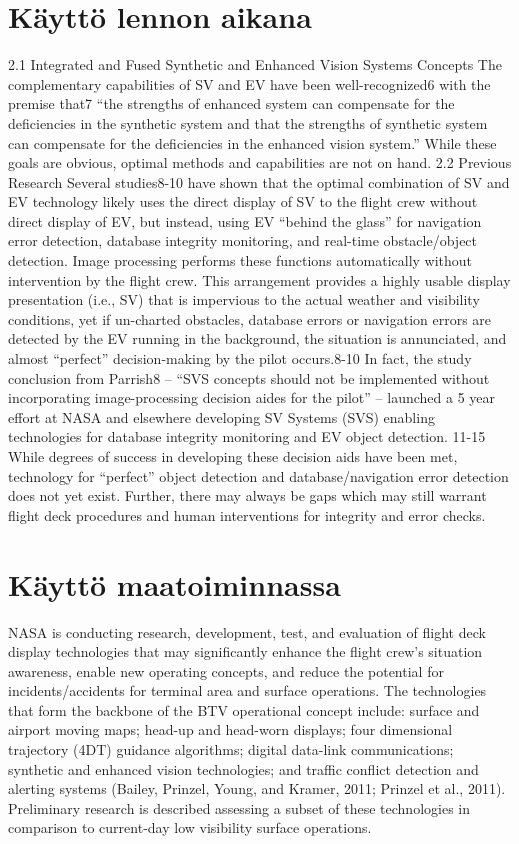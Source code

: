 \documentclass[utf8,bachelor,manualbib]{gradu3}
\begin{document}
\section{Käyttö lennon aikana}

2.1 Integrated and Fused Synthetic and Enhanced Vision Systems Concepts
The complementary capabilities of SV and EV have been well-recognized6 with the premise that7 “the
strengths of enhanced system can compensate for the deficiencies in the synthetic system and that the
strengths of synthetic system can compensate for the deficiencies in the enhanced vision system.” While
these goals are obvious, optimal methods and capabilities are not on hand.
2.2 Previous Research
Several studies8-10 have shown that the optimal combination of SV and EV technology likely uses the direct
display of SV to the flight crew without direct display of EV, but instead, using EV “behind the glass” for
navigation error detection, database integrity monitoring, and real-time obstacle/object detection. Image
processing performs these functions automatically without intervention by the flight crew. This arrangement
provides a highly usable display presentation (i.e., SV) that is impervious to the actual weather and visibility
conditions, yet if un-charted obstacles, database errors or navigation errors are detected by the EV running in
the background, the situation is annunciated, and almost “perfect” decision-making by the pilot occurs.8-10 In
fact, the study conclusion from Parrish8 – “SVS concepts should not be implemented without incorporating
image-processing decision aides for the pilot” – launched a 5 year effort at NASA and elsewhere developing
SV Systems (SVS) enabling technologies for database integrity monitoring and EV object detection. 11-15
While degrees of success in developing these decision aids have been met, technology for “perfect” object
detection and database/navigation error detection does not yet exist. Further, there may always be gaps which
may still warrant flight deck procedures and human interventions for integrity and error checks.
\citep{baileyym2007}

\citep{baileyym2007}

\section{Käyttö maatoiminnassa}

NASA is conducting research, development, test, and evaluation of flight deck display technologies that may significantly enhance the flight crew's situation awareness, enable new operating concepts, and reduce the potential for incidents/accidents for terminal area and surface operations. The technologies that form the backbone of the BTV operational concept include: surface and airport moving maps; head-up and head-worn displays; four dimensional trajectory (4DT) guidance algorithms; digital data-link communications; synthetic and enhanced vision technologies; and traffic conflict detection and alerting systems (Bailey, Prinzel, Young, and Kramer, 2011; Prinzel et al., 2011). Preliminary research is described assessing a subset of these technologies in comparison to current-day low visibility surface operations. \citep{prinzel2013}
\end{document}
